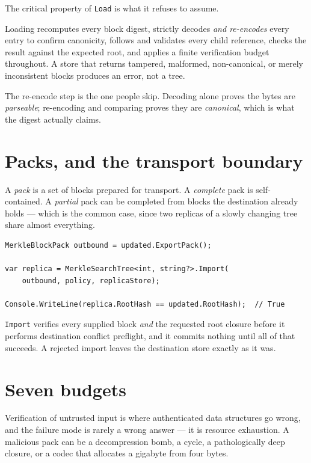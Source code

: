 \documentclass[11pt,twoside,openright]{book}
\newcommand{\code}[1]{\texorpdfstring{\textcolor{d7ink}{\texttt{#1}}}{#1}}
\newcommand{\term}[1]{\textit{#1}}
\begin{document}
The critical property of \code{Load} is what it refuses to assume.

\begin{contractbox}
Loading recomputes every block digest, strictly decodes \emph{and re-encodes}
every entry to confirm canonicity, follows and validates every child reference,
checks the result against the expected root, and applies a finite verification
budget throughout. A store that returns tampered, malformed, non-canonical, or
merely inconsistent blocks produces an error, not a tree.

The re-encode step is the one people skip. Decoding alone proves the bytes are
\emph{parseable}; re-encoding and comparing proves they are \emph{canonical},
which is what the digest actually claims.
\end{contractbox}

\section{Packs, and the transport boundary}

A \term{pack} is a set of blocks prepared for transport. A \emph{complete} pack
is self-contained. A \emph{partial} pack can be completed from blocks the
destination already holds --- which is the common case, since two replicas of a
slowly changing tree share almost everything.

\begin{lstlisting}[language={[Sharp]C}]
MerkleBlockPack outbound = updated.ExportPack();

var replica = MerkleSearchTree<int, string?>.Import(
    outbound, policy, replicaStore);

Console.WriteLine(replica.RootHash == updated.RootHash);  // True
\end{lstlisting}

\code{Import} verifies every supplied block \emph{and} the requested root closure
before it performs destination conflict preflight, and it commits nothing until
all of that succeeds. A rejected import leaves the destination store exactly as
it was.

\section{Seven budgets}

Verification of untrusted input is where authenticated data structures go wrong,
and the failure mode is rarely a wrong answer --- it is resource exhaustion. A
malicious pack can be a decompression bomb, a cycle, a pathologically deep
closure, or a codec that allocates a gigabyte from four bytes.
\end{document}
